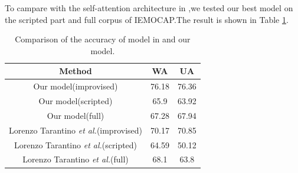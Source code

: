 \documentclass[10pt, conference, compsocconf]{IEEEtran}
\begin{document}
To campare with the self-attention architecture in \cite{tarantino2019self},we tested our best model on the scripted part and full corpus of IEMOCAP.The result is shown in Table \ref{ScriptAndAll}.

\begin{table}[h]
	\renewcommand\arraystretch{1.5}
	\setlength{\abovecaptionskip}{-0.2cm}
	\caption{Comparison of the accuracy of model in \cite{tarantino2019self} and our model.}
	\label{ScriptAndAll}
	\begin{center}  
		\begin{tabular}{|c|c|c|} 
			\hline  
			Method & WA & UA\\   
			\hline  
			Our model(improvised) & 76.18 & 76.36 \\   
			\hline
			Our model(scripted) & 65.9 & 63.92 \\   			
			\hline
			Our model(full) & 67.28 & 67.94 \\   
			\hline
			Lorenzo Tarantino \emph{et al.}\cite{tarantino2019self}(improvised) & 70.17 & 70.85 \\   
			\hline
			Lorenzo Tarantino \emph{et al.}\cite{tarantino2019self}(scripted) & 64.59 & 50.12 \\   
			\hline
			Lorenzo Tarantino \emph{et al.}\cite{tarantino2019self}(full) & 68.1 & 63.8 \\   
			\hline
		\end{tabular}  
	\end{center}  
\end{table}
\end{document}
